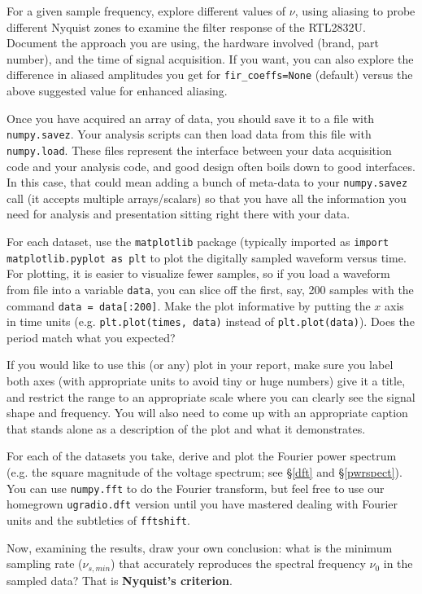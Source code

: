 \documentclass[11pt,preprint]{aastex}
\begin{document}
For a given sample frequency,
explore different values of $\nu$, using aliasing to probe different Nyquist zones to
examine the filter response of the RTL2832U.
Document the approach you are using,
the hardware involved (brand, part number), and the
time of signal acquisition. If you want, you can also explore the
difference in aliased amplitudes you get for {\tt fir\_coeffs=None}
(default) versus the above suggested value for enhanced aliasing.

Once you have acquired an array of data, you should save it to a file
with {\tt numpy.savez}.  Your analysis scripts can then 
load data from this file with {\tt numpy.load}. These files represent the interface
between your data acquisition code and your analysis code, and good design often
boils down to good interfaces. In this case, that could mean adding a bunch of meta-data
to your {\tt numpy.savez} call (it accepts multiple arrays/scalars) so that you have
all the information you need for analysis and presentation sitting right there with your data.

For each dataset, use the {\tt matplotlib} package (typically imported
as {\tt import matplotlib.pyplot as plt} to plot
the digitally sampled waveform versus
time.  
For plotting, it is easier to visualize fewer samples, so if you load a waveform from file into
a variable {\tt data}, you can slice off the first, say, 200 samples with the command {\tt data = data[:200]}.
Make the plot informative by putting the $x$ axis in time units (e.g. {\tt plt.plot(times, data)} instead of {\tt plt.plot(data)}). 
Does the period match what you expected?

If you would like to use this (or any) plot in your report, make sure you label both axes (with
appropriate units to avoid tiny or huge numbers)
give it a title, and restrict the range to an appropriate scale where you can clearly see
the signal shape and frequency. You will also need to come up with an appropriate caption that
stands alone as a description of the plot and what it demonstrates.

For each of the datasets you take, derive and plot the Fourier power spectrum
(e.g. the square magnitude of the voltage spectrum; see \S\ref{dft} and \S\ref{pwrspect}). You can use {\tt numpy.fft} to do the Fourier
transform, 
but feel free to use our homegrown {\tt ugradio.dft} version until you have mastered dealing with
Fourier units and the subtleties of {\tt fftshift}.

Now, examining the results, draw your own conclusion: what is the
minimum sampling rate ($\nu_{s,min}$) that accurately reproduces the spectral frequency $\nu_0$ in
the sampled data?  That is {\bf Nyquist's criterion}. 
\end{document}
